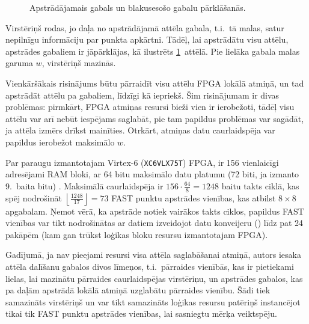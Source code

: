 \begin{figure}[tbh]
	\centering
	\def\svgwidth{0.9\linewidth}
	{\small}
	\caption{Apstrādājamais gabals un blakusesošo gabalu pārklāšanās.}
	\label{fig:chunks}
\end{figure}
Virstēriņš rodas, jo daļa no apstrādājamā attēla gabala, t.i.~tā malas,
satur nepilnīgu informāciju par punkta apkārtni. Tādēļ, lai apstrādātu
visu attēlu, apstrādes gabaliem ir jāpārklājas, kā ilustrēts
\ref{fig:chunks}~attēlā. Pie lielāka gabala malas garuma $w$,
virstēriņš mazinās.

Vienkāršākais risinājums būtu pārraidīt visu attēlu FPGA lokālā atmiņā,
un tad apstrādāt attēlu pa gabaliem, līdzīgi kā iepriekš. Šim
risinājumam ir divas problēmas: pirmkārt, FPGA atmiņas resursi bieži
vien ir ierobežoti, tādēļ visu attēlu var arī nebūt iespējams saglabāt,
pie tam papildus problēmas var sagādāt, ja attēla izmērs drīkst mainīties.
Otrkārt, atmiņas datu caurlaidspēja var papildus ierobežot
maksimālo $w$.

Par paraugu izmantotajam Virtex-6 (\texttt{XC6VLX75T}) FPGA,
ir 156 vienlaicīgi adresējami RAM bloki, ar
64 bitu maksimālo datu platumu (72 biti, ja izmanto 9.~baita bitu)%
\cite{Virtex6}. Maksimālā caurlaidspēja ir $156 \cdot \frac{64}{8} = 1248$
baitu takts ciklā, kas spēj nodrošināt
$\left\lfloor \frac{1248}{17} \right\rfloor = 73$ FAST punktu apstrādes vienības,
kas atbilst $8 \times 8$ apgabalam.
Ņemot vērā, ka apstrāde notiek vairākos takts ciklos, papildus
FAST vienības var tikt nodrošinātas ar datiem izveidojot datu
konveijeru () līdz pat 24 pakāpēm
(kam gan trūkst loģikas bloku resursu izmantotajam FPGA).

Gadījumā, ja nav pieejami resursi visa attēla saglabāšanai atmiņā,
autors iesaka attēla dalīšanu gabalos divos līmeņos, t.i.~pārraides
vienībās, kas ir pietiekami lielas, lai mazinātu pārraides caurlaidspējas
virstēriņu, un apstrādes gabalos, kas pa daļām apstrādā lokālā atmiņā
uzglabātu pārraides vienību. Šādi tiek samazināts virstēriņš un var tikt
samazināts loģikas resursu patēriņš instancējot tikai tik FAST punktu 
apstrādes vienības, lai sasniegtu mērķa veiktspēju.

